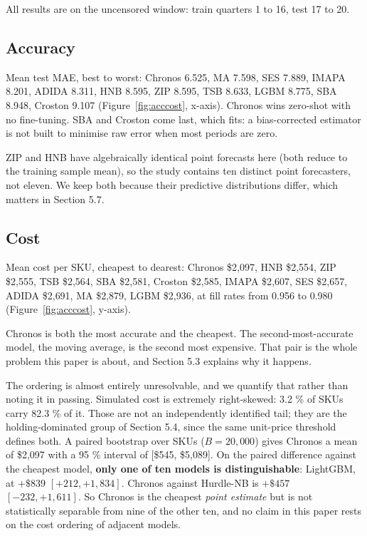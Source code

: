 \documentclass[11pt]{article}
\begin{document}
All results are on the uncensored window: train quarters 1 to 16, test 17 to 20.

\subsection{Accuracy}

Mean test MAE, best to worst: Chronos 6.525, MA 7.598, SES 7.889, IMAPA 8.201,
ADIDA 8.311, HNB 8.595, ZIP 8.595, TSB 8.633, LGBM 8.775, SBA 8.948, Croston
9.107 (Figure~\ref{fig:acccost}, x-axis). Chronos wins zero-shot with no
fine-tuning. SBA and Croston come last, which fits: a bias-corrected estimator
is not built to minimise raw error when most periods are zero.

ZIP and HNB have algebraically identical point forecasts here (both reduce to
the training sample mean), so the study contains ten distinct point
forecasters, not eleven. We keep both because their predictive distributions
differ, which matters in Section 5.7.

\subsection{Cost}

Mean cost per SKU, cheapest to dearest: Chronos \$2{,}097, HNB \$2{,}554, ZIP
\$2{,}555, TSB \$2{,}564, SBA \$2{,}581, Croston \$2{,}585, IMAPA \$2{,}607,
SES \$2{,}657, ADIDA \$2{,}691, MA \$2{,}879, LGBM \$2{,}936, at fill rates
from 0.956 to 0.980 (Figure~\ref{fig:acccost}, y-axis).

Chronos is both the most accurate and the cheapest. The second-most-accurate
model, the moving average, is the second most expensive. That pair is the whole
problem this paper is about, and Section 5.3 explains why it happens.

The ordering is almost entirely unresolvable, and we quantify that rather than
noting it in passing. Simulated cost is extremely right-skewed: 3.2 \% of SKUs
carry 82.3 \% of it. Those are not an independently identified tail; they are
the holding-dominated group of Section 5.4, since the same unit-price threshold
defines both. A paired bootstrap over SKUs ($B = 20{,}000$) gives
Chronos a mean of \$2{,}097 with a 95 \% interval of [\$545, \$5{,}089]. On the
paired difference against the cheapest model, \textbf{only one of ten models is
distinguishable}: LightGBM, at $+\$839$ $[+212, +1{,}834]$. Chronos against
Hurdle-NB is $+\$457$ $[-232, +1{,}611]$. So Chronos is the cheapest
\emph{point estimate} but is not statistically separable from nine of the other
ten, and no claim in this paper rests on the cost ordering of adjacent
models.
\end{document}
